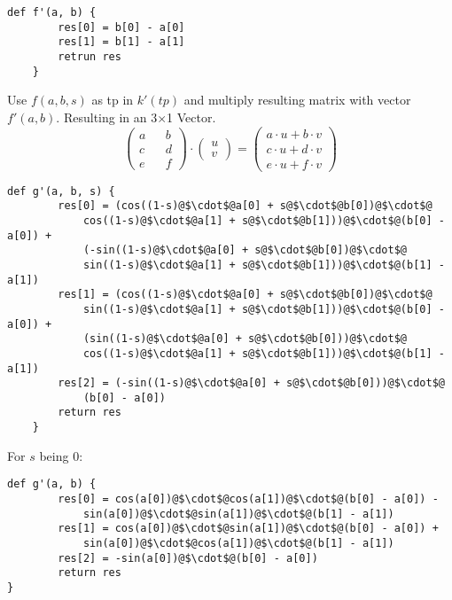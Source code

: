 \begin{lstlisting}[escapechar=@]
    def f'(a, b) {
        res[0] = b[0] - a[0]
        res[1] = b[1] - a[1]
        retrun res
    }
\end{lstlisting}
Use $f(a, b, s)$ as tp in $k'(tp)$ and multiply resulting matrix with vector $f'(a, b)$. Resulting in an 3$\times$1 Vector.
\begin{equation*}
    \begin{pmatrix}
        a && b \\
        c && d \\
        e && f
    \end{pmatrix}
    \cdot
    \begin{pmatrix}
        u \\
        v
    \end{pmatrix}
    =
    \begin{pmatrix}
        a\cdot u + b\cdot v \\
        c\cdot u + d\cdot v \\
        e\cdot u + f\cdot v
    \end{pmatrix}
\end{equation*}
\begin{lstlisting}[escapechar=@]
    def g'(a, b, s) {
        res[0] = (cos((1-s)@$\cdot$@a[0] + s@$\cdot$@b[0])@$\cdot$@
            cos((1-s)@$\cdot$@a[1] + s@$\cdot$@b[1]))@$\cdot$@(b[0] - a[0]) +
            (-sin((1-s)@$\cdot$@a[0] + s@$\cdot$@b[0])@$\cdot$@
            sin((1-s)@$\cdot$@a[1] + s@$\cdot$@b[1]))@$\cdot$@(b[1] - a[1])
        res[1] = (cos((1-s)@$\cdot$@a[0] + s@$\cdot$@b[0])@$\cdot$@
            sin((1-s)@$\cdot$@a[1] + s@$\cdot$@b[1]))@$\cdot$@(b[0] - a[0]) +
            (sin((1-s)@$\cdot$@a[0] + s@$\cdot$@b[0]))@$\cdot$@
            cos((1-s)@$\cdot$@a[1] + s@$\cdot$@b[1]))@$\cdot$@(b[1] - a[1])
        res[2] = (-sin((1-s)@$\cdot$@a[0] + s@$\cdot$@b[0]))@$\cdot$@
            (b[0] - a[0])
        return res
    }
\end{lstlisting}
For $s$ being $0$:
\begin{lstlisting}[escapechar=@]
    def g'(a, b) {
        res[0] = cos(a[0])@$\cdot$@cos(a[1])@$\cdot$@(b[0] - a[0]) -
            sin(a[0])@$\cdot$@sin(a[1])@$\cdot$@(b[1] - a[1])
        res[1] = cos(a[0])@$\cdot$@sin(a[1])@$\cdot$@(b[0] - a[0]) +
            sin(a[0])@$\cdot$@cos(a[1])@$\cdot$@(b[1] - a[1])
        res[2] = -sin(a[0])@$\cdot$@(b[0] - a[0])
        return res
}
\end{lstlisting}